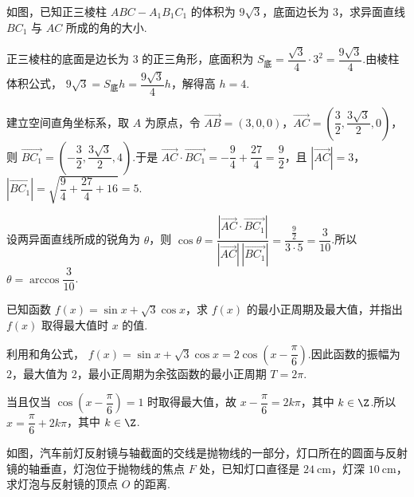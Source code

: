 \begin{problem}
如图，已知正三棱柱 \(ABC-A_1B_1C_1\) 的体积为 \(9\sqrt3\)，底面边长为 \(3\)，求异面直线 \(BC_1\) 与 \(AC\) 所成的角的大小.

\end{problem}

\begin{solution}
正三棱柱的底面是边长为 \(3\) 的正三角形，底面积为
\(S_{\text{底}}=\dfrac{\sqrt3}{4}\cdot3^2=\dfrac{9\sqrt3}{4}\).由棱柱体积公式，
\(9\sqrt3=S_{\text{底}}h=\dfrac{9\sqrt3}{4}h\)，解得高 \(h=4\).

建立空间直角坐标系，取 \(A\) 为原点，令 \(\overrightarrow{AB}=(3,0,0)\)，\(\overrightarrow{AC}=\left(\dfrac32,\dfrac{3\sqrt3}{2},0\right)\)，则
\(\overrightarrow{BC_1}=\left(-\dfrac32,\dfrac{3\sqrt3}{2},4\right)\).于是
\(\overrightarrow{AC}\cdot\overrightarrow{BC_1}=-\dfrac94+\dfrac{27}{4}=\dfrac92\)，且 \(|\overrightarrow{AC}|=3\)，
\(|\overrightarrow{BC_1}|=\sqrt{\dfrac94+\dfrac{27}{4}+16}=5\).

设两异面直线所成的锐角为 \(\theta\)，则
\(\cos\theta=\dfrac{|\overrightarrow{AC}\cdot\overrightarrow{BC_1}|}{|\overrightarrow{AC}|\,|\overrightarrow{BC_1}|}=\dfrac{\frac{9}{2}}{3\cdot5}=\dfrac3{10}\).所以 \(\theta=\arccos\dfrac3{10}\).
\end{solution}

\begin{problem}
已知函数 \(f(x)=\sin x+\sqrt3\cos x\)，求 \(f(x)\) 的最小正周期及最大值，并指出 \(f(x)\) 取得最大值时 \(x\) 的值.
\end{problem}

\begin{solution}
利用和角公式，
\(f(x)=\sin x+\sqrt3\cos x=2\cos\left(x-\dfrac{\pi}{6}\right)\).因此函数的振幅为 \(2\)，最大值为 \(2\)，最小正周期为余弦函数的最小正周期 \(T=2\pi\).

当且仅当 \(\cos\left(x-\dfrac{\pi}{6}\right)=1\) 时取得最大值，故
\(x-\dfrac{\pi}{6}=2k\pi\)，其中 \(k\in\Z\).所以 \(x=\dfrac{\pi}{6}+2k\pi\)，其中 \(k\in\Z\).
\end{solution}

\begin{problem}
如图，汽车前灯反射镜与轴截面的交线是抛物线的一部分，灯口所在的圆面与反射镜的轴垂直，灯泡位于抛物线的焦点 \(F\) 处，已知灯口直径是 \(24\mathrm{~cm}\)，灯深 \(10\mathrm{~cm}\)，求灯泡与反射镜的顶点 \(O\) 的距离.

\end{problem}

